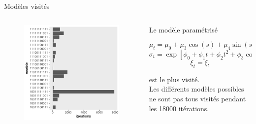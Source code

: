 \documentclass[aspectratio=169]{beamer}
\begin{document}
\begin{frame}{Modèles visités}
\begin{columns}
	\begin{column}{0.4\textwidth}
		\begin{figure}
		\vspace{-0.4cm}
	 		\includegraphics[height=0.85\textheight, center]{../figures/models.pdf}
		\end{figure}
	\end{column}
	\begin{column}{0.6\textwidth}
    Le modèle paramétrisé
    \begin{fleqn}
    \begin{equation*}
		\mu_t = \mu_0 + \mu_3 \cos(s) + \mu_4 \sin(s),
	\end{equation*}
	\begin{equation*}
		\sigma_t = \exp[\phi_0 + \phi_1 t + \phi_2 t^2 + \phi_3 \cos(s) + \phi_4 \sin(s)],
	\end{equation*}
	\begin{equation*}
		\xi_t = \xi,
	\end{equation*}
	\end{fleqn}
	est le plus visité.
	\vspace{0.5cm} \\
	Les différents modèles possibles ne sont pas tous visités pendant les 18000 itérations.
	\end{column}
\end{columns}
\end{frame}
\end{document}
